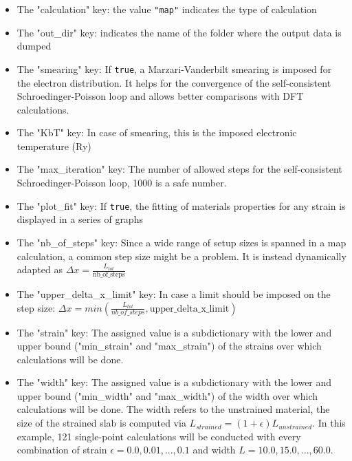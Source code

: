 \documentclass[a4paper,12pt]{article}
\begin{document}
\begin{itemize}
\item The "calculation" key: the value \texttt{"map"} indicates the type of calculation

\item The "out\_dir" key: indicates the name of the folder where the output data is dumped

\item The "smearing" key: If \texttt{true}, a Marzari-Vanderbilt smearing is imposed for the electron distribution. It helps for the convergence of the self-consistent Schroedinger-Poisson loop and allows better comparisons with DFT calculations.

\item The "KbT" key: In case of smearing, this is the imposed electronic temperature (Ry)

\item The "max\_iteration" key: The number of allowed steps for the self-consistent Schroedinger-Poisson loop, 1000 is a safe number.

\item The "plot\_fit" key: If \texttt{true}, the fitting of materials properties for any strain is displayed in a series of graphs

\item The "nb\_of\_steps" key: Since a wide range of setup sizes is spanned in a map calculation, a common step size might be a problem. It is instead dynamically adapted as $\Delta x = \frac{L_{tot}}{\text{nb\_of\_steps}}$

\item The "upper\_delta\_x\_limit" key: In case a limit should be imposed on the step size: $\Delta x = min(\frac{L_{tot}}{nb\_of
\_steps}, \text{upper\_delta\_x\_limit})$

\item The "strain" key: The assigned value is a subdictionary with the lower and upper bound ("min\_strain" and "max\_strain") of the strains over which calculations will be done. 

\item The "width" key: The assigned value is a subdictionary with the lower and upper bound ("min\_width" and "max\_width") of the width over which calculations will be done. The width refers to the unstrained material, the size of the strained slab is computed via $L_{strained} = (1+\epsilon)L_{unstrained}$. In this example, 121 single-point calculations will be conducted with every combination of strain $\epsilon = 0.0, 0.01,...,0.1$ and width $L = 10.0, 15.0,..., 60.0$.


\end{itemize}
\end{document}
